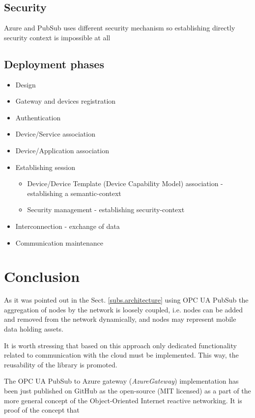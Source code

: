 \documentclass{jacsart}
\begin{document}
\subsection{Security}

Azure and PubSub uses different security mechanism so establishing directly security context is impossible at all

\subsection{Deployment phases}

\begin{itemize}
      \item Design
      \item Gateway and devices registration
      \item Authentication
      \item Device/Service association
      \item Device/Application association
      \item Establishing session
            \begin{itemize}
                  \item Device/Device Template (Device Capability Model) association - establishing a semantic-context
                  \item Security management - establishing security-context
            \end{itemize}
      \item Interconnection - exchange of data
      \item Communication maintenance
\end{itemize}

\section{Conclusion}\label{section.conclusion}

As it was pointed out in the Sect. \ref*{subs.architecture} using OPC UA PubSub the aggregation of nodes by the network is loosely coupled, i.e. nodes can be added and removed from the network dynamically, and nodes may represent mobile data holding assets. 

It is worth stressing that based on this approach only dedicated functionality related to communication with the cloud must be implemented. This way, the reusability of the library is promoted.

The OPC UA PubSub to Azure gateway (\textit{AzureGateway}) implementation has been just published on GitHub as the open-source (MIT licensed) as a part of the more general concept of the Object-Oriented Internet reactive networking. It is proof of the concept that
\end{document}
